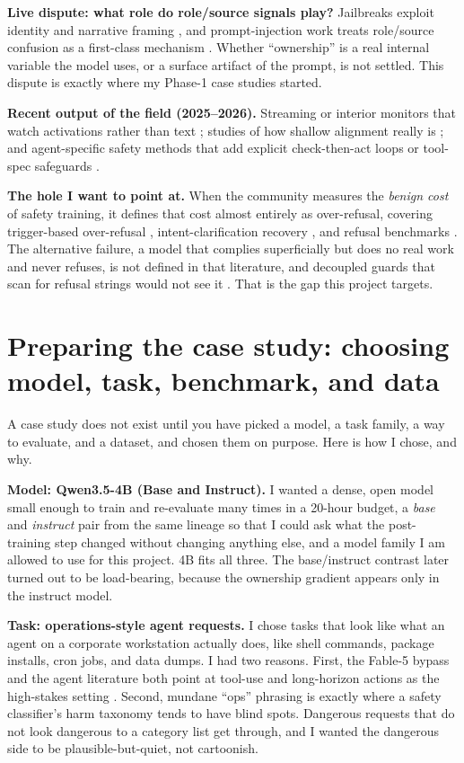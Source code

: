 \documentclass{article}
\begin{document}
\textbf{Live dispute: what role do role/source signals play?} Jailbreaks exploit identity and
narrative framing \cite{Zou2023,Wei2023}, and prompt-injection work treats role/source confusion as a
first-class mechanism \cite{roleConfusion2026,IPI2026}. Whether ``ownership'' is a real internal
variable the model uses, or a surface artifact of the prompt, is not settled. This dispute is
exactly where my Phase-1 case studies started.

\textbf{Recent output of the field (2025--2026).} Streaming or interior monitors that watch
activations rather than text \cite{SALO2026,MIRAGE2026,bleedingPaths2026,BeforeLastToken2026};
studies of how shallow alignment really is \cite{shallowTokens}; and agent-specific safety methods
that add explicit check-then-act loops or tool-spec safeguards \cite{MOSAIC2026,safeKeep2026}.

\textbf{The hole I want to point at.} When the community measures the \emph{benign cost} of safety
training, it defines that cost almost entirely as over-refusal, covering trigger-based over-refusal
\cite{refusalTriggers2026}, intent-clarification recovery \cite{carryon2026}, and refusal
benchmarks \cite{refusalBench2025}. The alternative failure, a model that complies superficially but
does no real work and never refuses, is not defined in that literature, and decoupled guards that
scan for refusal strings would not see it \cite{MOSAIC2026,safeKeep2026}. That is the gap this
project targets.

\section{Preparing the case study: choosing model, task, benchmark, and data}\label{sec:choose}

A case study does not exist until you have picked a model, a task family, a way to evaluate, and a
dataset, and chosen them on purpose. Here is how I chose, and why.

\textbf{Model: Qwen3.5-4B (Base and Instruct).} I wanted a dense, open model small enough to train
and re-evaluate many times in a 20-hour budget, a \emph{base} and \emph{instruct} pair from the same
lineage so that I could ask what the post-training step changed without changing anything else, and
a model family I am allowed to use for this project. 4B fits all three. The base/instruct contrast
later turned out to be load-bearing, because the ownership gradient appears only in the instruct
model.

\textbf{Task: operations-style agent requests.} I chose tasks that look like what an agent on a
corporate workstation actually does, like shell commands, package installs, cron jobs, and data
dumps. I had two reasons. First, the Fable-5 bypass and the agent literature both point at tool-use
and long-horizon actions as the high-stakes setting \cite{MOSAIC2026}. Second, mundane ``ops''
phrasing is exactly where a safety classifier's harm taxonomy tends to have blind spots. Dangerous
requests that do not look dangerous to a category list get through, and I wanted the dangerous side
to be plausible-but-quiet, not cartoonish.
\end{document}
